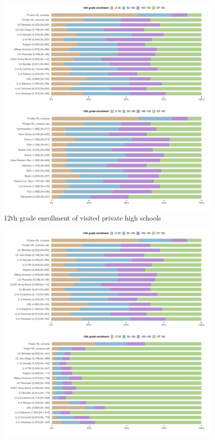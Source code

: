 \documentclass[
  12pt,
]{article}
\begin{document}
\begin{landscape}
\newpage


\begin{figure}

{\centering \includegraphics[width=2\linewidth]{./ego_network_enroll_pubu_privu} 

}

\caption{12th grade enrollment of visited private high schools}\label{fig:enroll-pubu-privu}
\end{figure}

\newpage

\begin{figure}

{\centering \includegraphics[width=2\linewidth]{./ego_network_enroll_pubu_privhs_pubhs} 

}
\end{figure}
\end{landscape}
\end{document}
